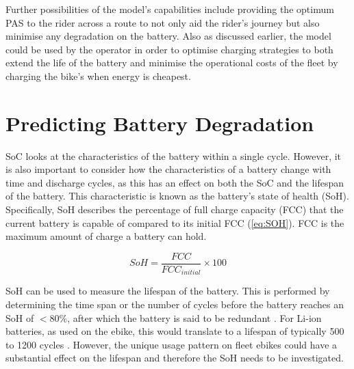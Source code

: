 \documentclass[a4paper, 10pt]{article}
\numberwithin{equation}{section}
\begin{document}
Further possibilities of the model's capabilities include providing the optimum PAS to the rider across a route to not only aid the rider's journey but also minimise any degradation on the battery. Also as discussed earlier, the model could be used by the operator in order to optimise charging strategies to both extend the life of the battery and minimise the operational costs of the fleet by charging the bike's when energy is cheapest.

\newpage

\section{Predicting Battery Degradation}
\label{section:SOH}


SoC looks at the characteristics of the battery within a single cycle. However, it is also important to consider how the characteristics of a battery change with time and discharge cycles, as this has an effect on both the SoC and the lifespan of the battery. This characteristic is known as the battery's state of health (SoH). Specifically, SoH describes the percentage of full charge capacity (FCC) that the current battery is capable of compared to its initial FCC (\ref{eq:SOH}). FCC is the maximum amount of charge a battery can hold.

\begin{equation}\label{eq:SOH}
    SoH = \frac{FCC}{FCC_{initial}}\times100
\end{equation}

SoH can be used to measure the lifespan of the battery. This is performed by determining  the time span or the number of cycles before the battery reaches an SoH of $<80\%$, after which the battery is said to be redundant \cite{ISO}. For Li-ion batteries, as used on the ebike, this would translate to a lifespan of typically 500 to 1200 cycles \cite{web:batt_life}. However, the unique usage pattern on fleet ebikes could have a substantial effect on the lifespan and therefore the SoH needs to be investigated.

\end{document}
